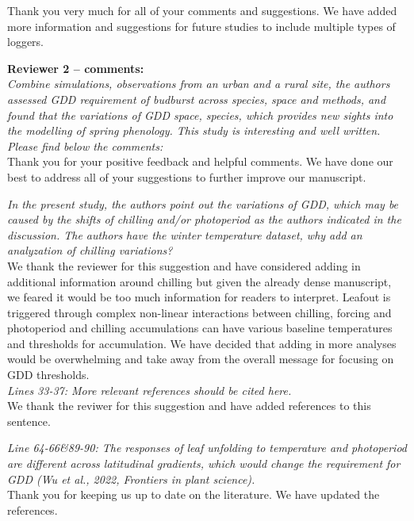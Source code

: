 \documentclass[11pt,a4paper]{article}\usepackage[]{graphicx}\usepackage[]{color}
\begin{document}
Thank you very much for all of your comments and suggestions. We have added more information and suggestions for future studies to include multiple types of loggers. 

\textbf {Reviewer 2 -- comments:} \\

\textit{Combine simulations, observations from an urban and a rural site, the authors assessed GDD requirement of budburst across species, space and methods, and found that the variations of GDD space, species, which provides new sights into the modelling of spring phenology. This study is interesting and well written. Please find below the comments:} \\

Thank you for your positive feedback and helpful comments. We have done our best to address all of your suggestions to further improve our manuscript.

\textit{In the present study, the authors point out the variations of GDD, which may be caused by the shifts of chilling and/or photoperiod as the authors indicated in the discussion. The authors have the winter temperature dataset, why add an analyzation of chilling variations?} \\

We thank the reviewer for this suggestion and have considered adding in additional information around chilling but given the already dense manuscript, we feared it would be too much information for readers to interpret. Leafout is triggered through complex non-linear interactions between chilling, forcing and photoperiod and chilling accumulations can have various baseline temperatures and thresholds for accumulation. We have decided that adding in more analyses would be overwhelming and take away from the overall message for focusing on GDD thresholds.  \\

\textit{Lines 33-37: More relevant references should be cited here.} \\

We thank the reviwer for this suggestion and have added references to this sentence. 

\textit{Line 64-66&89-90: The responses of leaf unfolding to temperature and photoperiod are different across latitudinal gradients, which would change the requirement for GDD (Wu et al., 2022, Frontiers in plant science).}\\

Thank you for keeping us up to date on the literature. We have updated the references. 
\end{document}

